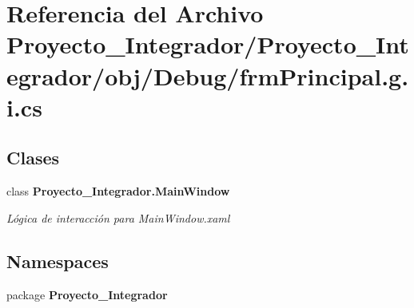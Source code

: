 \section{Referencia del Archivo Proyecto\-\_\-\-Integrador/\-Proyecto\-\_\-\-Integrador/obj/\-Debug/frm\-Principal.g.\-i.\-cs}
\label{frm_principal_8g_8i_8cs}
\subsection*{Clases}
\begin{DoxyCompactItemize}
\item 
class {\bf Proyecto\-\_\-\-Integrador.\-Main\-Window}
\begin{DoxyCompactList}\small\item\em Lógica de interacción para Main\-Window.\-xaml \end{DoxyCompactList}\end{DoxyCompactItemize}
\subsection*{Namespaces}
\begin{DoxyCompactItemize}
\item 
package {\bf Proyecto\-\_\-\-Integrador}
\end{DoxyCompactItemize}
